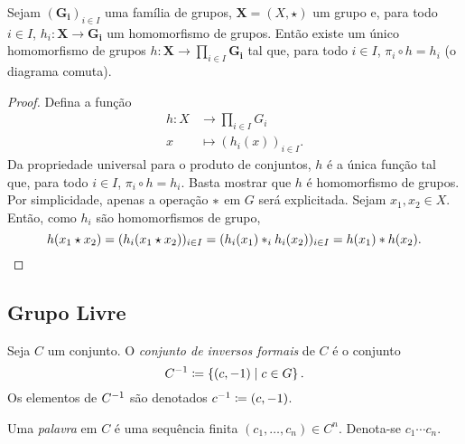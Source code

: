 \begin{prop}
Sejam $(\bm{G_i})_{i \in I}$ uma família de grupos, $\bm X = (X,\star)$ um grupo e, para todo $i \in I$, $h_i: \bm X \to \bm{G_i}$ um homomorfismo de grupos. Então existe um único homomorfismo de grupos $h: \bm X \to \prod_{i \in I} \bm{G_i}$ tal que, para todo $i \in I$, $\pi_i \circ h = h_i$ (o diagrama comuta).
\begin{figure}
\centering
{}
\end{figure}
\end{prop}
\begin{proof}
Defina a função
	\begin{align*}
	h: X &\to \prod_{i \in I} G_i \\
		x &\mapsto (h_i(x))_{i \in I}.
	\end{align*}
Da propriedade universal para o produto de conjuntos, $h$ é a única função tal que, para todo $i \in I$, $\pi_i \circ h = h_i$. Basta mostrar que $h$ é homomorfismo de grupos. Por simplicidade, apenas a operação $\ast$ em $G$ será explicitada. Sejam $x_1,x_2 \in X$. Então, como $h_i$ são homomorfismos de grupo,
	\begin{equation*}
	h(x_1 \star x_2) = (h_i(x_1 \star x_2))_{i \in I} = (h_i(x_1) \ast_i h_i(x_2))_{i \in I} = h(x_1) \ast h(x_2).
	\end{equation*}
\end{proof}

\subsection{Grupo Livre}

\begin{defi}
Seja $C$ um conjunto. O \emph{conjunto de inversos formais} de $C$ é o conjunto
	\begin{equation*}
	C\inv \coloneqq \set{(c,-1)}{c \in G}.
	\end{equation*}
Os elementos de $C^{-1}$ são denotados $c\inv \coloneqq (c,-1)$.

Uma \emph{palavra} em $C$ é uma sequência finita $(c_1,\ldots,c_n) \in C^n$. Denota-se $c_1 \cdots c_n$.
\end{defi}

